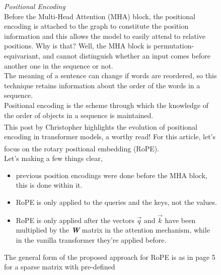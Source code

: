 \documentclass[12pt]{article}
\newcommand{\customtext}[3]{%
    \vspace{#2} %
    \fontsize{13}{8}\textcolor{#1}{\textit{#3}}%
}
\newcommand{\bandi}[1]{\textbf{\textit{#1}}}
\newcommand{\sidecite}[1]{\textsuperscript{\textcolor{blue}{\textbf{\scriptsize#1}}}}
\newcommand{\maincitecount}{\sidecite{\stepcounter{maincite}\themaincite}}
\begin{document}
\begin{figure}[!htb]
    \begin{minipage}[t]{0.65\textwidth}
    \customtext{xtitle}{0em}{Positional Encoding}\\
    Before the Multi-Head Attention (MHA) block, the positional encoding is attached to the graph to constitute the position information and 
    this allows the model to easily attend to relative positions.
    Why is that? Well, the MHA block is permutation-equivariant, and cannot distinguish whether an input comes before another one in the 
    sequence or not.\\
    The meaning of a sentence can change if words are reordered, so this technique retains information about the order of the words in a sequence.\\
    Positional encoding is the scheme through which the knowledge of the order of objects in a sequence is maintained.\\
    This post by Christopher{\maincitecount} highlights the evolution of positional encoding in transformer models, a worthy read! For this article, 
    let's focus on the rotary positional embedding (RoPE){\maincitecount}.\\    
    Let's making a few things clear, 
    \begin{itemize}[left=0pt,topsep=0pt,itemsep=0ex,parsep=0ex]
        \item previous position encodings were done before the MHA block, this is done within it.
        \item RoPE is only applied to the queries and the keys, not the values. 
        \item RoPE is only applied after the vectors $\vec{q}$ and $\vec{k}$ have been multiplied by the 
        \bandi{W} matrix in the attention mechanism, while in the vanilla transformer they're applied before.
      \end{itemize}
    \vspace{1em}
    The general form of the proposed approach for RoPE is as in page 5 for a sparse matrix with pre-defined 

\end{minipage}
\end{figure}
\end{document}
